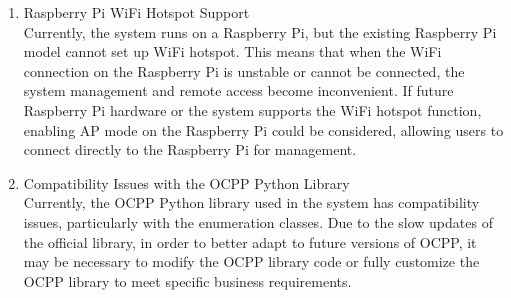\documentclass[
	english,
	ruledheaders=section,%
	class=report,%
	thesis={type=Report},%
	accentcolor=9c,%
	custommargins=true,%
	marginpar=false,%
	parskip=half-,%
	fontsize=11pt,%
	logofile={img/tuda_logo.pdf}, %
]{tudapub}
\begin{document}
\begin{enumerate}

\item Raspberry Pi WiFi Hotspot Support\\
Currently, the system runs on a Raspberry Pi, but the existing Raspberry Pi model cannot set up WiFi hotspot. This means that when the WiFi connection on the Raspberry Pi is unstable or cannot be connected, the system management and remote access become inconvenient. If future Raspberry Pi hardware or the system supports the WiFi hotspot function, enabling AP mode on the Raspberry Pi could be considered, allowing users to connect directly to the Raspberry Pi for management.


\item Compatibility Issues with the \ac{OCPP} Python Library\\
Currently, the \ac{OCPP} Python library used in the system has compatibility issues, particularly with the enumeration classes. Due to the slow updates of the official library, in order to better adapt to future versions of \ac{OCPP}, it may be necessary to modify the \ac{OCPP} library code or fully customize the \ac{OCPP} library to meet specific business requirements.



\end{enumerate}
\end{document}
